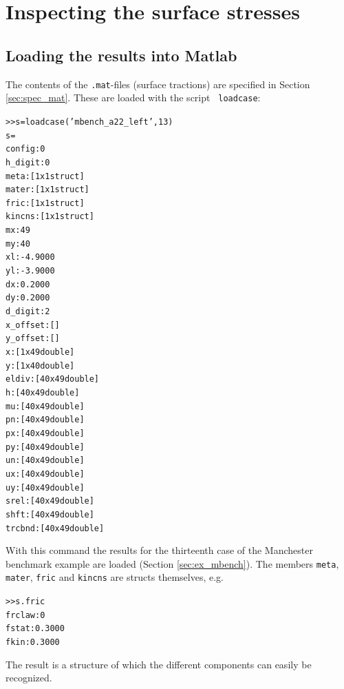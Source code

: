 \documentclass[12pt]{report}
\begin{document}
\section{Inspecting the surface stresses}
\label{sec:plot_surf}

\subsection{Loading the results into Matlab}

The contents of the {\tt .mat}-files (surface tractions) are specified in
Section \ref{sec:spec_mat}. These are loaded with the script {\tt
loadcase}:
\begin{alltt}\small
>> s = loadcase('mbench_a22_left', 13)
s = 
       config: 0
      h_digit: 0
         meta: [1x1 struct]
        mater: [1x1 struct]
         fric: [1x1 struct]
       kincns: [1x1 struct]
           mx: 49
           my: 40
           xl: -4.9000
           yl: -3.9000
           dx: 0.2000
           dy: 0.2000
      d_digit: 2
     x_offset: []
     y_offset: []
            x: [1x49 double]
            y: [1x40 double]
        eldiv: [40x49 double]
            h: [40x49 double]
           mu: [40x49 double]
           pn: [40x49 double]
           px: [40x49 double]
           py: [40x49 double]
           un: [40x49 double]
           ux: [40x49 double]
           uy: [40x49 double]
         srel: [40x49 double]
         shft: [40x49 double]
       trcbnd: [40x49 double]
\end{alltt}
With this command the results for the thirteenth case of the Manchester
benchmark example are loaded (Section \ref{sec:ex_mbench}). The members
{\tt meta}, {\tt mater}, {\tt fric} and {\tt kincns} are
structs themselves, e.g.
\begin{alltt}\small
>> s.fric
    frclaw: 0
     fstat: 0.3000
      fkin: 0.3000
\end{alltt}
The result is a structure of which the different components can easily be
recognized. 
\end{document}
